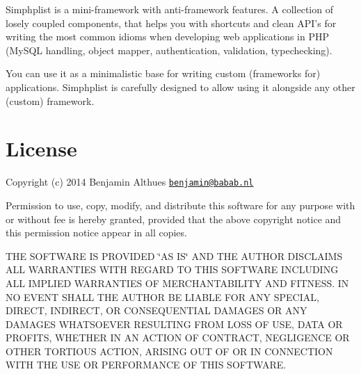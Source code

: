 Simphplist is a mini-\/framework with anti-\/framework features. A collection of losely coupled components, that helps you with shortcuts and clean A\+P\+I's for writing the most common idioms when developing web applications in P\+H\+P (My\+S\+Q\+L handling, object mapper, authentication, validation, typechecking).

You can use it as a minimalistic base for writing custom (frameworks for) applications. Simphplist is carefully designed to allow using it alongside any other (custom) framework.\hypertarget{index_license}{}\section{License}\label{index_license}
Copyright (c) 2014 Benjamin Althues \href{mailto:benjamin@babab.nl}{\tt benjamin@babab.\+nl}

Permission to use, copy, modify, and distribute this software for any purpose with or without fee is hereby granted, provided that the above copyright notice and this permission notice appear in all copies.

T\+H\+E S\+O\+F\+T\+W\+A\+R\+E I\+S P\+R\+O\+V\+I\+D\+E\+D \char`\"{}\+A\+S I\+S\char`\"{} A\+N\+D T\+H\+E A\+U\+T\+H\+O\+R D\+I\+S\+C\+L\+A\+I\+M\+S A\+L\+L W\+A\+R\+R\+A\+N\+T\+I\+E\+S W\+I\+T\+H R\+E\+G\+A\+R\+D T\+O T\+H\+I\+S S\+O\+F\+T\+W\+A\+R\+E I\+N\+C\+L\+U\+D\+I\+N\+G A\+L\+L I\+M\+P\+L\+I\+E\+D W\+A\+R\+R\+A\+N\+T\+I\+E\+S O\+F M\+E\+R\+C\+H\+A\+N\+T\+A\+B\+I\+L\+I\+T\+Y A\+N\+D F\+I\+T\+N\+E\+S\+S. I\+N N\+O E\+V\+E\+N\+T S\+H\+A\+L\+L T\+H\+E A\+U\+T\+H\+O\+R B\+E L\+I\+A\+B\+L\+E F\+O\+R A\+N\+Y S\+P\+E\+C\+I\+A\+L, D\+I\+R\+E\+C\+T, I\+N\+D\+I\+R\+E\+C\+T, O\+R C\+O\+N\+S\+E\+Q\+U\+E\+N\+T\+I\+A\+L D\+A\+M\+A\+G\+E\+S O\+R A\+N\+Y D\+A\+M\+A\+G\+E\+S W\+H\+A\+T\+S\+O\+E\+V\+E\+R R\+E\+S\+U\+L\+T\+I\+N\+G F\+R\+O\+M L\+O\+S\+S O\+F U\+S\+E, D\+A\+T\+A O\+R P\+R\+O\+F\+I\+T\+S, W\+H\+E\+T\+H\+E\+R I\+N A\+N A\+C\+T\+I\+O\+N O\+F C\+O\+N\+T\+R\+A\+C\+T, N\+E\+G\+L\+I\+G\+E\+N\+C\+E O\+R O\+T\+H\+E\+R T\+O\+R\+T\+I\+O\+U\+S A\+C\+T\+I\+O\+N, A\+R\+I\+S\+I\+N\+G O\+U\+T O\+F O\+R I\+N C\+O\+N\+N\+E\+C\+T\+I\+O\+N W\+I\+T\+H T\+H\+E U\+S\+E O\+R P\+E\+R\+F\+O\+R\+M\+A\+N\+C\+E O\+F T\+H\+I\+S S\+O\+F\+T\+W\+A\+R\+E. 